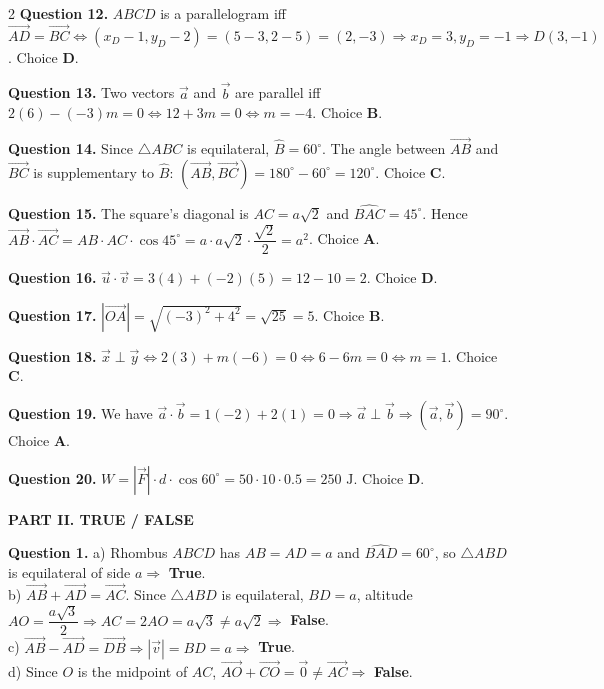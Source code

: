 \documentclass[10pt,a4paper]{article}
\begin{document}
\begin{multicols}{2}
\textbf{Question 12.} $ABCD$ is a parallelogram iff $\vec{AD} = \vec{BC} \Leftrightarrow (x_D - 1, y_D - 2) = (5 - 3, 2 - 5) = (2, -3) \Rightarrow x_D = 3, y_D = -1 \Rightarrow D(3, -1)$. Choice \textbf{D}.

\textbf{Question 13.} Two vectors $\vec{a}$ and $\vec{b}$ are parallel iff $2(6) - (-3)m = 0 \Leftrightarrow 12 + 3m = 0 \Leftrightarrow m = -4$. Choice \textbf{B}.

\textbf{Question 14.} Since $\triangle ABC$ is equilateral, $\widehat{B} = 60^\circ$. The angle between $\vec{AB}$ and $\vec{BC}$ is supplementary to $\widehat{B}$: $(\vec{AB}, \vec{BC}) = 180^\circ - 60^\circ = 120^\circ$. Choice \textbf{C}.

\textbf{Question 15.} The square's diagonal is $AC = a\sqrt{2}$ and $\widehat{BAC} = 45^\circ$. Hence $\vec{AB} \cdot \vec{AC} = AB \cdot AC \cdot \cos 45^\circ = a \cdot a\sqrt{2} \cdot \dfrac{\sqrt{2}}{2} = a^2$. Choice \textbf{A}.

\textbf{Question 16.} $\vec{u} \cdot \vec{v} = 3(4) + (-2)(5) = 12 - 10 = 2$. Choice \textbf{D}.

\textbf{Question 17.} $|\vec{OA}| = \sqrt{(-3)^2 + 4^2} = \sqrt{25} = 5$. Choice \textbf{B}.

\textbf{Question 18.} $\vec{x} \perp \vec{y} \Leftrightarrow 2(3) + m(-6) = 0 \Leftrightarrow 6 - 6m = 0 \Leftrightarrow m = 1$. Choice \textbf{C}.

\textbf{Question 19.} We have $\vec{a} \cdot \vec{b} = 1(-2) + 2(1) = 0 \Rightarrow \vec{a} \perp \vec{b} \Rightarrow (\vec{a}, \vec{b}) = 90^\circ$. Choice \textbf{A}.

\textbf{Question 20.} $W = |\vec{F}| \cdot d \cdot \cos 60^\circ = 50 \cdot 10 \cdot 0.5 = 250\text{ J}$. Choice \textbf{D}.

\columnbreak

\textbf{\color{accent}PART II. TRUE / FALSE}

\textbf{Question 1.}
a) Rhombus $ABCD$ has $AB = AD = a$ and $\widehat{BAD} = 60^\circ$, so $\triangle ABD$ is equilateral of side $a \Rightarrow$ \textbf{True}.\\
b) $\vec{AB} + \vec{AD} = \vec{AC}$. Since $\triangle ABD$ is equilateral, $BD = a$, altitude $AO = \dfrac{a\sqrt{3}}{2} \Rightarrow AC = 2AO = a\sqrt{3} \ne a\sqrt{2} \Rightarrow$ \textbf{False}.\\
c) $\vec{AB} - \vec{AD} = \vec{DB} \Rightarrow |\vec{v}| = BD = a \Rightarrow$ \textbf{True}.\\
d) Since $O$ is the midpoint of $AC$, $\vec{AO} + \vec{CO} = \vec{0} \ne \vec{AC} \Rightarrow$ \textbf{False}.


\end{multicols}
\end{document}
